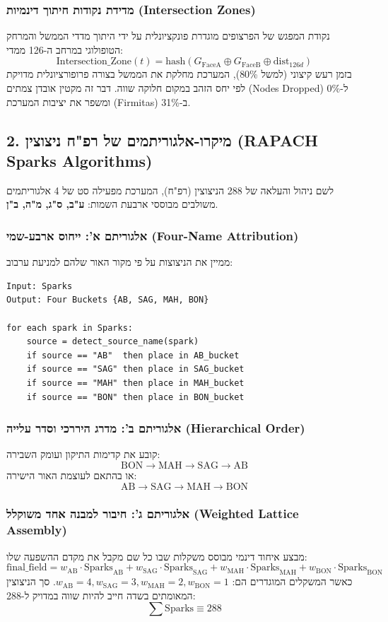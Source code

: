 \documentclass{article}
\begin{document}
\subsubsection{מדידת נקודות חיתוך דינמיות (Intersection Zones)}
נקודת המפגש של הפרצופים מוגדרת פונקציונלית על ידי היתוך מדדי הממשל והמרחק הטופולוגי במרחב ה-126 ממדי:
\[ \text{Intersection\_Zone}(t) = \text{hash}(G_{\text{FaceA}} \oplus G_{\text{FaceB}} \oplus \text{dist}_{126d}) \]
בזמן רעש קיצוני (למשל 80\%), המערכת מחלקת את הממשל בצורה פרופורציונלית מדויקת לפי יחס הזהב במקום חלוקה שווה. דבר זה מקטין אובדן צמתים (Nodes Dropped) ל-0\% ומשפר את יציבות המערכת (Firmitas) ב-31\%.

\subsection{2. מיקרו-אלגוריתמים של רפ"ח ניצוצין (RAPACH Sparks Algorithms)}
לשם ניהול והעלאה של 288 הניצוצין (רפ"ח), המערכת מפעילה סט של 4 אלגוריתמים משולבים מבוססי ארבעת השמות: \textbf{ע"ב, ס"ג, מ"ה, ב"ן}.

\subsubsection{אלגוריתם א': ייחוס ארבע-שמי (Four-Name Attribution)}
ממיין את הניצוצות על פי מקור האור שלהם למניעת ערבוב:
\begin{verbatim}
Input: Sparks
Output: Four Buckets {AB, SAG, MAH, BON}

for each spark in Sparks:
    source = detect_source_name(spark)
    if source == "AB"  then place in AB_bucket
    if source == "SAG" then place in SAG_bucket
    if source == "MAH" then place in MAH_bucket
    if source == "BON" then place in BON_bucket
\end{verbatim}

\subsubsection{אלגוריתם ב': מדרג היררכי וסדר עלייה (Hierarchical Order)}
קובע את קדימות התיקון ועומק השבירה:
\[ \text{BON} \rightarrow \text{MAH} \rightarrow \text{SAG} \rightarrow \text{AB} \]
או בהתאם לעוצמת האור הישירה:
\[ \text{AB} \rightarrow \text{SAG} \rightarrow \text{MAH} \rightarrow \text{BON} \]

\subsubsection{אלגוריתם ג': חיבור למבנה אחד משוקלל (Weighted Lattice Assembly)}
מבצע איחוד דינמי מבוסס משקלות שבו כל שם מקבל את מקדם ההשפעה שלו:
\[ \text{final\_field} = w_{\text{AB}} \cdot \text{Sparks}_{\text{AB}} + w_{\text{SAG}} \cdot \text{Sparks}_{\text{SAG}} + w_{\text{MAH}} \cdot \text{Sparks}_{\text{MAH}} + w_{\text{BON}} \cdot \text{Sparks}_{\text{BON}} \]
כאשר המשקלים המוגדרים הם: $w_{\text{AB}} = 4, w_{\text{SAG}} = 3, w_{\text{MAH}} = 2, w_{\text{BON}} = 1$. סך הניצוצין המאומתים בשדה חייב להיות שווה במדויק ל-288:
\[ \sum \text{Sparks} \equiv 288 \]
\end{document}
